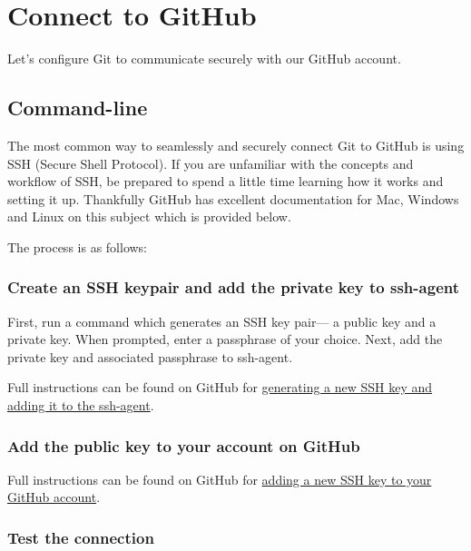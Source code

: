 \documentclass[
  letterpaper,
  DIV=11,
  numbers=noendperiod]{scrartcl}
\begin{document}
\section{Connect to GitHub}\label{connect-to-github}

Let's configure Git to communicate securely with our GitHub account.

\subsection{Command-line}

The most common way to seamlessly and securely connect Git to GitHub is
using SSH (Secure Shell Protocol). If you are unfamiliar with the
concepts and workflow of SSH, be prepared to spend a little time
learning how it works and setting it up. Thankfully GitHub has excellent
documentation for Mac, Windows and Linux on this subject which is
provided below.

The process is as follows:

\subsubsection{Create an SSH keypair and add the private key to
ssh-agent}\label{create-an-ssh-keypair-and-add-the-private-key-to-ssh-agent}

First, run a command which generates an SSH key pair--- a public key and
a private key. When prompted, enter a passphrase of your choice. Next,
add the private key and associated passphrase to ssh-agent.

Full instructions can be found on GitHub for
\href{https://docs.github.com/en/authentication/connecting-to-github-with-ssh/generating-a-new-ssh-key-and-adding-it-to-the-ssh-agent}{generating
a new SSH key and adding it to the ssh-agent}.

\subsubsection{Add the public key to your account on
GitHub}\label{add-the-public-key-to-your-account-on-github}

Full instructions can be found on GitHub for
\href{https://docs.github.com/en/authentication/connecting-to-github-with-ssh/adding-a-new-ssh-key-to-your-github-account}{adding
a new SSH key to your GitHub account}.

\subsubsection{Test the connection}\label{test-the-connection}
\end{document}
